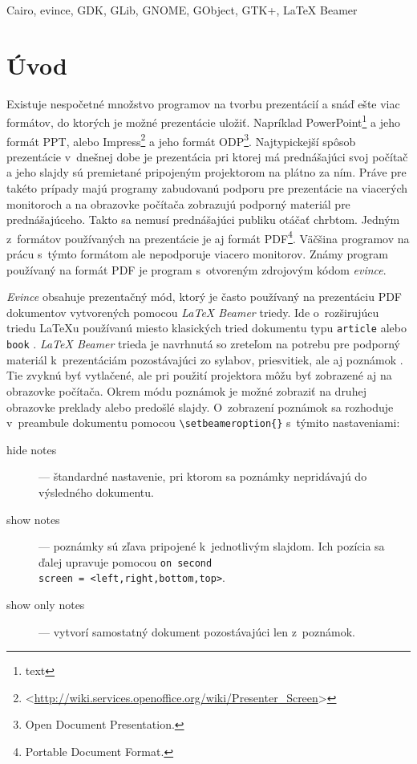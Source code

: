 \documentclass[12pt,oneside,final]{fithesis2}
\begin{document}
\begin{ThesisKeyWords}
Cairo, evince, GDK, GLib, GNOME, GObject, GTK+, LaTeX Beamer
\end{ThesisKeyWords}
 
\MainMatter
\setcounter{tocdepth}{3}
\tableofcontents 
 
\chapter{Úvod}

Existuje nespočetné množstvo programov na tvorbu prezentácií a snáď ešte viac formátov, do ktorých je možné prezentácie uložiť. Napríklad PowerPoint\footnote{text} a jeho formát PPT, alebo Impress\footnote{<\url{http://wiki.services.openoffice.org/wiki/Presenter_Screen}>} a jeho formát ODP\footnote{Open Document Presentation.}. Najtypickejší spôsob prezentácie v~dnešnej dobe je prezentácia pri ktorej má prednášajúci svoj počítač a jeho slajdy sú premietané pripojeným projektorom na plátno za ním. Práve pre takéto prípady majú programy zabudovanú podporu pre prezentácie na viacerých monitoroch a na obrazovke počítača zobrazujú podporný materiál pre prednášajúceho. Takto sa nemusí prednášajúci publiku otáčať chrbtom. Jedným z~formátov používaných na prezentácie je aj formát PDF\footnote{Portable Document Format.}. Väčšina programov na prácu s~týmto formátom ale nepodporuje viacero monitorov. Známy program používaný na formát PDF je program s~otvoreným zdrojovým kódom \emph{evince}.

\emph{Evince} obsahuje prezentačný mód, ktorý je často používaný na prezentáciu PDF dokumentov vytvorených pomocou \emph{LaTeX Beamer} triedy. Ide o~rozširujúcu triedu LaTeXu používanú miesto klasických tried dokumentu typu \texttt{article} alebo \texttt{book} \cite{abclatex}. \emph{LaTeX Beamer} trieda je navrhnutá so zreteľom na potrebu pre podporný materiál k~prezentáciám pozostávajúci zo sylabov, priesvitiek, ale aj poznámok \cite{beamer}. Tie zvyknú byť vytlačené, ale pri použití projektora môžu byť zobrazené aj na obrazovke počítača. Okrem módu poznámok je možné zobraziť na druhej obrazovke preklady alebo predošlé slajdy. O~zobrazení poznámok sa rozhoduje v~preambule dokumentu pomocou \verb|\setbeameroption{}| s~týmito nastaveniami:
\begin{description}
\item[hide notes] --- štandardné nastavenie, pri ktorom sa poznámky nepridávajú do výsledného dokumentu.
\item[show notes] --- poznámky sú zľava pripojené k~jednotlivým slajdom. Ich pozícia sa ďalej upravuje pomocou \texttt{on second \\ screen = <left,right,bottom,top>}.
\item[show only notes]  --- vytvorí samostatný dokument pozostávajúci len z~poznámok.
\end{description}
\end{document}
